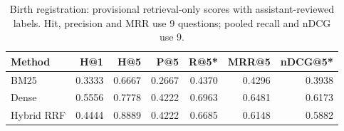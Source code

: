 \begin{table}[htbp]\centering\small
\caption{Birth registration: provisional retrieval-only scores with assistant-reviewed labels. Hit, precision and MRR use 9 questions; pooled recall and nDCG use 9.}\label{tab:retrieval-birth_death_registration}
\begin{tabularx}{\linewidth}{Xrrrrrr}\toprule
Method & H@1 & H@5 & P@5 & R@5* & MRR@5 & nDCG@5*\\\midrule
BM25 & 0.3333 & 0.6667 & 0.2667 & 0.4370 & 0.4296 & 0.3938\\
Dense & 0.5556 & 0.7778 & 0.4222 & 0.6963 & 0.6481 & 0.6173\\
Hybrid RRF & 0.4444 & 0.8889 & 0.4222 & 0.6685 & 0.6148 & 0.5882\\
\bottomrule\end{tabularx}\end{table}

